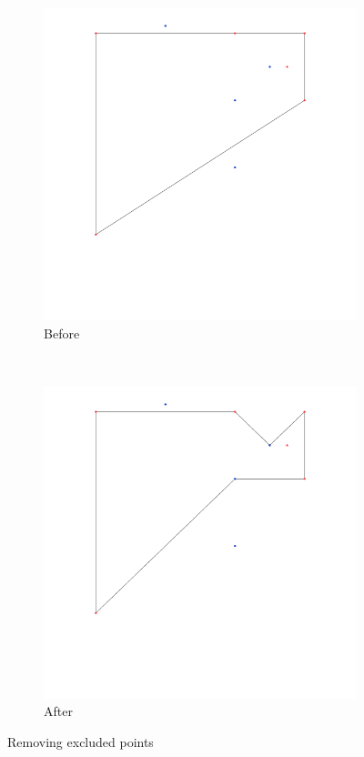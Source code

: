 \documentclass[paper=a4, fontsize=11pt]{scrartcl} %
\numberwithin{equation}{section} %
\numberwithin{figure}{section} %
\numberwithin{table}{section} %
\begin{document}
\begin{figure}
        \centering
        \begin{subfigure}[b]{0.4\textwidth}
                \includegraphics[width=\textwidth]{exc_before}
                \caption{Before}
        \end{subfigure}%
        ~ %
        \begin{subfigure}[b]{0.4\textwidth}
                \includegraphics[width=\textwidth]{exc_after}
                \caption{After}
        \end{subfigure}
        \caption{Removing excluded points}\label{fig:exc}
\end{figure}
\end{document}
